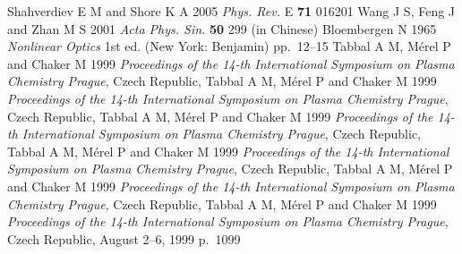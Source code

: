\documentclass{APS}
\begin{document}
\begin{Bib}
 Shahverdiev E M and Shore K A 2005 \textit{Phys. Rev.} E {\bf 71}
016201
 Wang J S, Feng J and Zhan M S 2001 \textit{Acta Phys. Sin.} {\bf
50} 299 (in Chinese)
 Bloembergen N 1965 \textit{Nonlinear Optics} 1st ed. (New York:
Benjamin) pp.~12--15
 Tabbal A M, M\'erel P and Chaker M 1999 \textit{Proceedings of the {\rm 14}-th
International Symposium on Plasma Chemistry  Prague}, Czech Republic,
 Tabbal A M, M\'erel P and Chaker M 1999 \textit{Proceedings of the {\rm 14}-th
International Symposium on Plasma Chemistry  Prague}, Czech Republic,
 Tabbal A M, M\'erel P and Chaker M 1999 \textit{Proceedings of the {\rm 14}-th
International Symposium on Plasma Chemistry  Prague}, Czech Republic,
 Tabbal A M, M\'erel P and Chaker M 1999 \textit{Proceedings of the {\rm 14}-th
International Symposium on Plasma Chemistry  Prague}, Czech Republic,
 Tabbal A M, M\'erel P and Chaker M 1999 \textit{Proceedings of the {\rm 14}-th
International Symposium on Plasma Chemistry  Prague}, Czech Republic,
 Tabbal A M, M\'erel P and Chaker M 1999 \textit{Proceedings of the {\rm 14}-th
International Symposium on Plasma Chemistry  Prague}, Czech Republic,
August 2--6, 1999  p.~1099
\end{Bib}
\newpage
\end{document}

